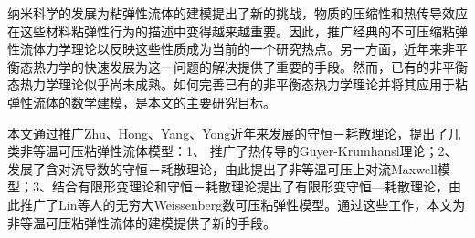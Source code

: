 
\begin{cabstract}
纳米科学的发展为粘弹性流体的建模提出了新的挑战，物质的压缩性和热传导效应在这些材料粘弹性行为的描述中变得越来越重要。因此，推广经典的不可压缩粘弹性流体力学理论以反映这些性质成为当前的一个研究热点。另一方面，近年来非平衡态热力学的快速发展为这一问题的解决提供了重要的手段。然而，已有的非平衡态热力学理论似乎尚未成熟。如何完善已有的非平衡态热力学理论并将其应用于粘弹性流体的数学建模，是本文的主要研究目标。



本文通过推广Zhu、Hong、Yang、Yong近年来发展的守恒－耗散理论，提出了几类非等温可压粘弹性流体模型：1、 推广了热传导的Guyer-Krumhansl理论；2、发展了含对流导数的守恒－耗散理论，由此提出了非等温可压上对流Maxwell模型；3、结合有限形变理论和守恒－耗散理论提出了有限形变守恒—耗散理论，由此推广了Lin等人的无穷大Weissenberg数可压粘弹性模型。通过这些工作，本文为非等温可压粘弹性流体的建模提供了新的手段。




\end{cabstract}
